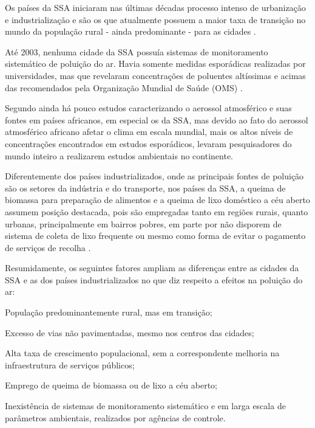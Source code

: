 Os países da SSA iniciaram nas últimas décadas processo intenso de urbanização e
industrialização e são os que atualmente possuem a maior taxa de transição no 
mundo da população rural - ainda predominante - para as cidades 
\citep{MONTGOMERY2008}. 
 
Até 2003, nenhuma cidade da SSA possuía sistemas de monitoramento 
sistemático de poluição do ar. Havia somente medidas esporádicas realizadas
por universidades, mas que revelaram concentrações de poluentes altíssimas e 
acimas das recomendados pela Organização Mundial de Saúde (OMS) 
\citep{EZZATI2004}.

Segundo \citet{aboh2009} ainda há pouco estudos caracterizando o 
aerossol atmosférico e suas fontes em países africanos, em especial os da SSA, 
mas devido ao fato do aerossol atmosférico africano afetar o clima em escala 
mundial, mais os altos níveis de concentrações encontrados em estudos 
esporádicos, levaram pesquisadores do mundo inteiro a realizarem estudos
ambientais no continente.

Diferentemente dos países industrializados, onde as principais fontes de 
poluição são os setores da indústria e do transporte, nos países da SSA, a 
queima de biomassa para preparação de alimentos e a queima de lixo 
doméstico a céu aberto assumem posição destacada, pois são empregadas tanto em 
regiões rurais, quanto urbanas, principalmente em bairros pobres, 
em parte por não disporem de sistema de coleta de lixo frequente ou 
mesmo como forma de evitar o pagamento de serviços de recolha \citep{SMITH2004}.

Resumidamente, os seguintes fatores ampliam as diferenças entre as cidades da 
SSA e as dos países industrializados no que diz respeito a efeitos na 
poluição do ar:
 
\begin{itemize}
\begin{spacing}{1.0}
  \item População predominantemente rural, mas em transição;
  \item Excesso de vias não pavimentadas, mesmo nos centros das cidades;
  \item Alta taxa de crescimento populacional, sem a correspondente melhoria 
        na infraestrutura de serviços públicos;
  \item Emprego de queima de biomassa ou de lixo a céu aberto;
  \item Inexistência de sistemas de monitoramento sistemático e em larga escala
        de parâmetros ambientais, realizados por agências de controle.
\end{spacing}
\end{itemize}

